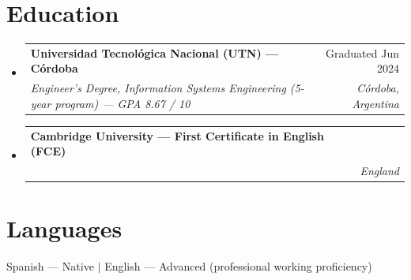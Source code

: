 \documentclass[letterpaper,11pt]{article}
\makeatletter
\newcommand{\resumeSubheading}[4]{
  \vspace{-2pt}\item
    \begin{tabular*}{0.97\textwidth}[t]{l@{\extracolsep{\fill}}r}
      \textbf{#1} & #2 \\
      \textit{\small#3} & \textit{\small #4} \\
    \end{tabular*}\vspace{-7pt}
}
\newcommand{\resumeSubHeadingListStart}{\begin{itemize}[leftmargin=0.15in, label={}]}
\newcommand{\resumeSubHeadingListEnd}{\end{itemize}}
\makeatother
\begin{document}
\section{Education}
  \resumeSubHeadingListStart
    \resumeSubheading
      {Universidad Tecnológica Nacional (UTN) — Córdoba}{Graduated Jun 2024}
      {Engineer's Degree, Information Systems Engineering (5-year program) — GPA 8.67 / 10}{Córdoba, Argentina}
    \resumeSubheading
      {Cambridge University — First Certificate in English (FCE)}{}
      {}{England}
  \resumeSubHeadingListEnd
  \vspace{-6pt}

\section{Languages}
 \begin{itemize}[leftmargin=0.15in, label={}]
    \small{\item{
     Spanish — Native \hspace{10pt} $|$ \hspace{10pt} English — Advanced (professional working proficiency)
    }}
 \end{itemize}

\end{document}
